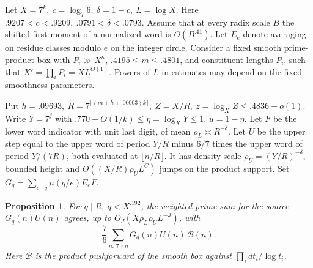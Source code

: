 \documentclass[11pt,a4paper]{article}
\theoremstyle{paperplain}
\newtheorem{proposition}[theorem]{Proposition}
\numberwithin{equation}{section}
\begin{document}
Let \(X=7^k,\ c=\log_7 6,\ \delta=1-c,\ L=\log X\). Here
\(.9207<c<.9209,\ .0791<\delta<.0793\). Assume that at every radix scale
\(B\) the shifted first moment of a normalized word is \(O(B^{.41})\).
Let \(E_e\) denote averaging on residue classes modulo \(e\) on the
integer circle. Consider a fixed smooth prime-product box with
\(P_i\gg X^\kappa\), \(.4195\le m\le.4801\), and constituent lengths
\(P_i\), such that \(X'=\prod_iP_i=XL^{O(1)}\). Powers of \(L\)
in estimates may depend on the fixed smoothness parameters.

Put \(h=.09693,\ R=7^{\lfloor(m+h+.00003)k\rfloor},\ Z=X/R,\ 
z=\log_X Z\le.4836+o(1)\). Write \(Y=7^j\) with
\(.770+O(1/k)\le\eta=\log_X Y\le1\), \(u=1-\eta\).
Let \(F\) be the lower word indicator with unit last digit, of mean
\(\rho_L\asymp R^{-\delta}\). Let \(U\) be the upper step equal to the 
upper word of period \(Y/R\) minus \(6/7\) times the upper word
of period \(Y/(7R)\), both evaluated at \(\lfloor n/R\rfloor\).
It has density scale \(\rho_U=(Y/R)^{-\delta}\), bounded height and
\(O((X/R)\rho_U L^C)\) jumps on the product support.
Set \(G_q=\sum_{e\mid q}\mu(q/e)E_e F\).

\begin{proposition}\label{seven:small-compare}
For \(q\mid R,\ q<X^{.192}\), the weighted prime sum for the
source \(G_q(n)U(n)\) agrees, up to \(O_J(X\rho_L\rho_U L^{-J})\), with
\[
 \frac{7}{6}\sum_{n:\,7\nmid n}G_q(n)U(n)\,\mathcal B(n).
\]
Here \(\mathcal B\) is the product pushforward of the smooth box
against \(\prod_i dt_i/\log t_i\).
\end{proposition}
\end{document}
